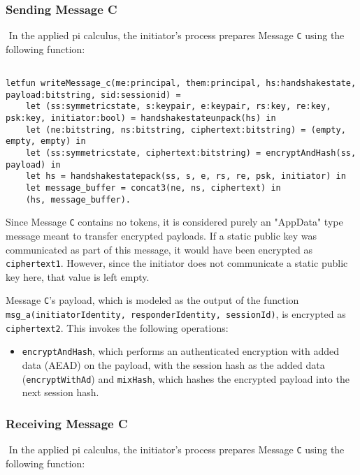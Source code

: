 \subsubsection{Sending Message C}$ $
In the applied pi calculus, the initiator's process prepares Message \texttt{C} using the following function:


\begin{lstlisting}

letfun writeMessage_c(me:principal, them:principal, hs:handshakestate, payload:bitstring, sid:sessionid) =
	let (ss:symmetricstate, s:keypair, e:keypair, rs:key, re:key, psk:key, initiator:bool) = handshakestateunpack(hs) in
	let (ne:bitstring, ns:bitstring, ciphertext:bitstring) = (empty, empty, empty) in
	let (ss:symmetricstate, ciphertext:bitstring) = encryptAndHash(ss, payload) in
	let hs = handshakestatepack(ss, s, e, rs, re, psk, initiator) in
	let message_buffer = concat3(ne, ns, ciphertext) in
	(hs, message_buffer).

\end{lstlisting}

Since Message \texttt{C} contains no tokens, it is considered purely an "AppData" type message meant to transfer encrypted payloads.
If a static public key was communicated as part of this message, it would have been encrypted as \texttt{ciphertext1}. However, since the initiator does not communicate a static public key here, that value is left empty.


Message \texttt{C}'s payload, which is modeled as the output of the function \texttt{msg\_a(initiatorIdentity, responderIdentity, sessionId)}, is encrypted as \texttt{ciphertext2}. This invokes the following operations:


\begin{itemize}

\item \texttt{encryptAndHash}, which performs an authenticated encryption with added data (AEAD) on the payload, with the session hash as the added data (\texttt{encryptWithAd}) and \texttt{mixHash}, which hashes the encrypted payload into the next session hash.

\end{itemize}
\subsubsection{Receiving Message C}$ $
In the applied pi calculus, the initiator's process prepares Message \texttt{C} using the following function:


